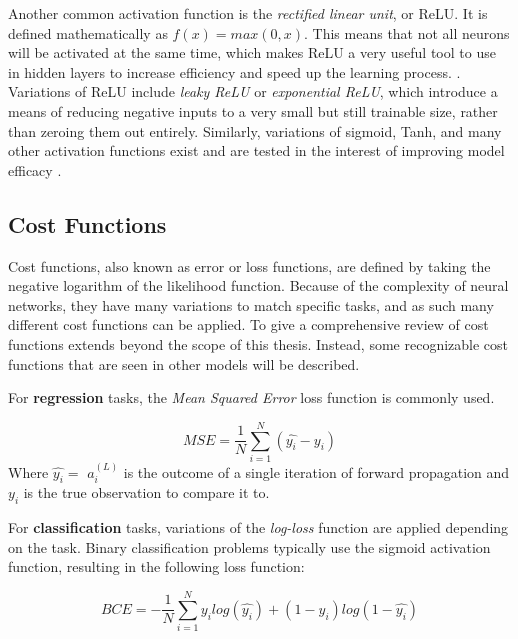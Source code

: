 Another common activation function is the \textit{rectified linear unit}, or ReLU.  It is defined mathematically as $f(x) = max(0,x)$.  This means that not all neurons will be activated at the same time, which makes ReLU a very useful tool to use in hidden layers to increase efficiency and speed up the learning process. \cite{Goodfellow-et-al-2016} \cite{sharma2017activation}. 
 Variations of ReLU include \textit{leaky ReLU} or \textit{exponential ReLU}, which introduce a means of reducing negative inputs to a very small but still trainable size, rather than zeroing them out entirely.  Similarly, variations of sigmoid, Tanh, and many other activation functions exist and are tested in the interest of improving model efficacy \cite{banerjee2019empirical}.



\hypertarget{cost-functions}{%
\subsection{Cost Functions}\label{cost-functions}}

Cost functions, also known as error or loss functions, are defined by taking the negative logarithm of the likelihood function.\cite{bishop2006pattern}  Because of the complexity of neural networks, they have many variations to match specific tasks, and as such many different cost functions can be applied.  To give a comprehensive review of cost functions extends beyond the scope of this thesis.  Instead, some recognizable cost functions that are seen in other models will be described.

For \textbf{regression} tasks, the \textit{Mean Squared Error} loss function is commonly used.

\[
MSE = \frac{1}{N} \sum_{i=1}^N (\hat{y_i} - y_i)
\] Where $\hat{y_i} =$ \(a^{(L)}_i\) is the outcome of a single iteration of forward
propagation and \(y_i\) is the true observation to compare it to.

For \textbf{classification} tasks, variations of the \textit{log-loss} function are applied depending on the task.  Binary classification problems typically use the sigmoid activation function, resulting in the following loss function:


$$
BCE = - \frac{1}{N} \sum_{i=1}^N y_i log (\hat{y_i}) + (1-y_i) log(1-\hat{y_i})
$$

